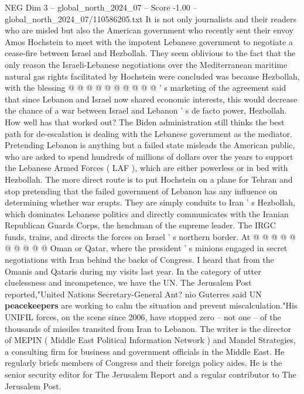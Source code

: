 \begin{textsample}{NEG Dim 3 – global\_north\_2024\_07 – Score -1.00 – global\_north\_2024\_07/110586205.txt}
It is not only journalists and their readers who are misled but also the American government who recently sent their envoy Amos Hochstein to meet with the impotent Lebanese government to negotiate a cease-fire between Israel and Hezbollah.
They seem oblivious to the fact that the only reason the Israeli-Lebanese negotiations over the Mediterranean maritime natural gas rights facilitated by Hochstein were concluded was because Hezbollah, with the blessing @ @ @ @ @ @ @ @ @ @ ' s marketing of the agreement said that since Lebanon and Israel now shared economic interests, this would decrease the chance of a war between Israel and Lebanon ' s de facto power, Hezbollah.
How well has that worked out?
The Biden administration still thinks the best path for de-escalation is dealing with the Lebanese government as the mediator.
Pretending Lebanon is anything but a failed state misleads the American public, who are asked to spend hundreds of millions of dollars over the years to support the Lebanese Armed Forces ( LAF ), which are either powerless or in bed with Hezbollah.
The more direct route is to put Hochstein on a plane for Tehran and stop pretending that the failed government of Lebanon has any influence on determining whether war erupts.
They are simply conduits to Iran ' s Hezbollah, which dominates Lebanese politics and directly communicates with the Iranian Republican Guards Corps, the henchman of the supreme leader.
The IRGC funds, trains, and directs the forces on Israel ' s northern border.
At @ @ @ @ @ @ @ @ @ @ Oman or Qatar, where the president ' s minions engaged in secret negotiations with Iran behind the backs of Congress.
I heard that from the Omanis and Qataris during my visits last year.
In the category of utter cluelessness and incompetence, we have the UN.
The Jerusalem Post reported,"United Nations Secretary-General Ant? nio Guterres said UN \textbf{peacekeepers} are working to calm the situation and prevent miscalculation."His UNIFIL forces, on the scene since 2006, have stopped zero -- not one -- of the thousands of missiles transited from Iran to Lebanon.
The writer is the director of MEPIN ( Middle East Political Information Network ) and Mandel Strategies, a consulting firm for business and government officials in the Middle East.
He regularly briefs members of Congress and their foreign policy aides.
He is the senior security editor for The Jerusalem Report and a regular contributor to The Jerusalem Post.

\end{textsample}
